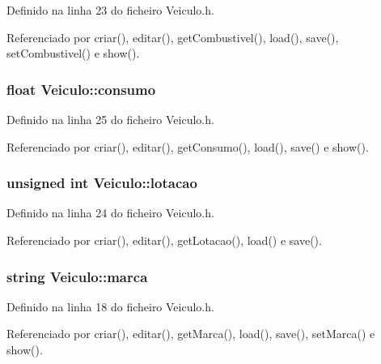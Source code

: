 Definido na linha 23 do ficheiro Veiculo.\+h.



Referenciado por criar(), editar(), get\+Combustivel(), load(), save(), set\+Combustivel() e show().

\hypertarget{class_veiculo_ab403615f82fdad74215512cedce23762}{
\subsubsection[{consumo}]{\setlength{\rightskip}{0pt plus 5cm}float Veiculo\+::consumo\hspace{0.3cm}{\ttfamily [private]}}}\label{class_veiculo_ab403615f82fdad74215512cedce23762}


Definido na linha 25 do ficheiro Veiculo.\+h.



Referenciado por criar(), editar(), get\+Consumo(), load(), save() e show().

\hypertarget{class_veiculo_af9dc20956b1b60e54b9a79f76cd971d3}{
\subsubsection[{lotacao}]{\setlength{\rightskip}{0pt plus 5cm}unsigned int Veiculo\+::lotacao\hspace{0.3cm}{\ttfamily [private]}}}\label{class_veiculo_af9dc20956b1b60e54b9a79f76cd971d3}


Definido na linha 24 do ficheiro Veiculo.\+h.



Referenciado por criar(), editar(), get\+Lotacao(), load() e save().

\hypertarget{class_veiculo_ab20b89442a0ddaedd074bb0de75838c8}{
\subsubsection[{marca}]{\setlength{\rightskip}{0pt plus 5cm}string Veiculo\+::marca\hspace{0.3cm}{\ttfamily [private]}}}\label{class_veiculo_ab20b89442a0ddaedd074bb0de75838c8}


Definido na linha 18 do ficheiro Veiculo.\+h.



Referenciado por criar(), editar(), get\+Marca(), load(), save(), set\+Marca() e show().

